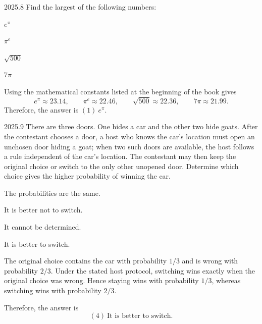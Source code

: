     \begin{pastproblem}{2025.8}
        Find the largest of the following numbers:
        \begin{problemchoices}
            \item \(e^\pi\)
            \item \(\pi^e\)
            \item \(\sqrt{500}\)
            \item $7\pi$
        \end{problemchoices}
    \end{pastproblem}

    \begin{solution}
        Using the mathematical constants listed at the beginning of the book gives
        \[
            e^\pi \approx 23.14,
            \qquad
            \pi^e \approx 22.46,
            \qquad
            \sqrt{500} \approx 22.36,
            \qquad
            7\pi \approx 21.99.
        \]
        Therefore, the answer is $\boxed{(1)\ e^\pi}$.
    \end{solution}

    \begin{pastproblem}{2025.9}
        There are three doors. One hides a car and the other two hide goats.
        After the contestant chooses a door, a host who knows the car's location
        must open an unchosen door hiding a goat; when two such doors are
        available, the host follows a rule independent of the car's location.
        The contestant may then keep the original choice or switch to the only
        other unopened door. Determine which choice gives the higher probability
        of winning the car.
        \begin{problemchoices}
            \item The probabilities are the same.
            \item It is better not to switch.
            \item It cannot be determined.
            \item It is better to switch.
        \end{problemchoices}
    \end{pastproblem}

    \begin{solution}
        The original choice contains the car with probability $1/3$ and is
        wrong with probability $2/3$. Under the stated host protocol, switching
        wins exactly when the original choice was wrong. Hence staying wins with
        probability $1/3$, whereas switching wins with probability $2/3$.

        Therefore, the answer is
        \[
            \boxed{(4)\ \text{It is better to switch}}.
        \]
    \end{solution}

